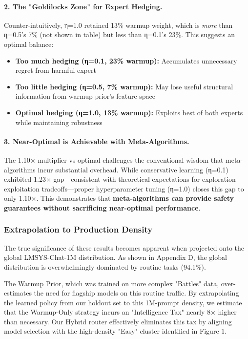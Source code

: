 \paragraph{2. The "Goldilocks Zone" for Expert Hedging.}
Counter-intuitively, η=1.0 retained 13\% warmup weight, which is \emph{more} than η=0.5's 7\% (not shown in table) but less than η=0.1's 23\%. This suggests an optimal balance:
\begin{itemize}[leftmargin=*,nosep]
    \item \textbf{Too much hedging (η=0.1, 23\% warmup):} Accumulates unnecessary regret from harmful expert
    \item \textbf{Too little hedging (η=0.5, 7\% warmup):} May lose useful structural information from warmup prior's feature space
    \item \textbf{Optimal hedging (η=1.0, 13\% warmup):} Exploits best of both experts while maintaining robustness
\end{itemize}

\paragraph{3. Near-Optimal is Achievable with Meta-Algorithms.}
The 1.10× multiplier vs optimal challenges the conventional wisdom that meta-algorithms incur substantial overhead. While conservative learning (η=0.1) exhibited 1.23× gap—consistent with theoretical expectations for exploration-exploitation tradeoffs—proper hyperparameter tuning (η=1.0) closes this gap to only 1.10×. This demonstrates that \textbf{meta-algorithms can provide safety guarantees without sacrificing near-optimal performance}.

\subsubsection{Extrapolation to Production Density}

The true significance of these results becomes apparent when projected onto the global LMSYS-Chat-1M distribution. As shown in Appendix D, the global distribution is overwhelmingly dominated by routine tasks (94.1\%).

The Warmup Prior, which was trained on more complex "Battles" data, over-estimates the need for flagship models on this routine traffic. By extrapolating the learned policy from our holdout set to this 1M-prompt density, we estimate that the Warmup-Only strategy incurs an "Intelligence Tax" nearly 8× higher than necessary. Our Hybrid router effectively eliminates this tax by aligning model selection with the high-density "Easy" cluster identified in Figure 1.

